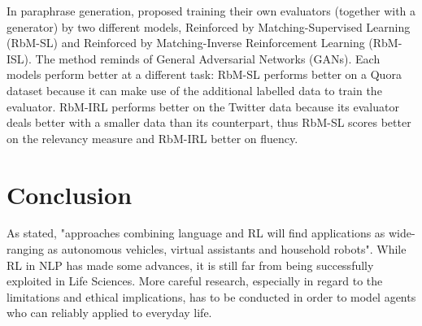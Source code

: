 \documentclass[11pt,a4paper]{article}
\begin{document}
In paraphrase generation, \citet{li-etal-2018-paraphrase} proposed training their own evaluators (together with a generator) by two different models, Reinforced by Matching-Supervised Learning (RbM-SL) and Reinforced by Matching-Inverse Reinforcement Learning (RbM-ISL). The method reminds of General Adversarial Networks (GANs). Each models perform better at a different task: RbM-SL performs better on a Quora dataset because it can make use of the additional labelled data to train the evaluator. RbM-IRL performs better on the Twitter data because its evaluator deals better with a smaller data than its counterpart, thus RbM-SL scores better on the relevancy measure and RbM-IRL better on fluency.

\section{Conclusion}
As  \citet{ijcai2019} stated, "approaches combining language and RL will find applications as wide-ranging as autonomous vehicles, virtual assistants and household robots". While RL in NLP has made some advances, it is still far from being successfully exploited in Life Sciences. More careful research, especially in regard to the limitations and ethical implications, has to be conducted in order to model agents who can reliably applied to everyday life. 

\newpage

\end{document}
